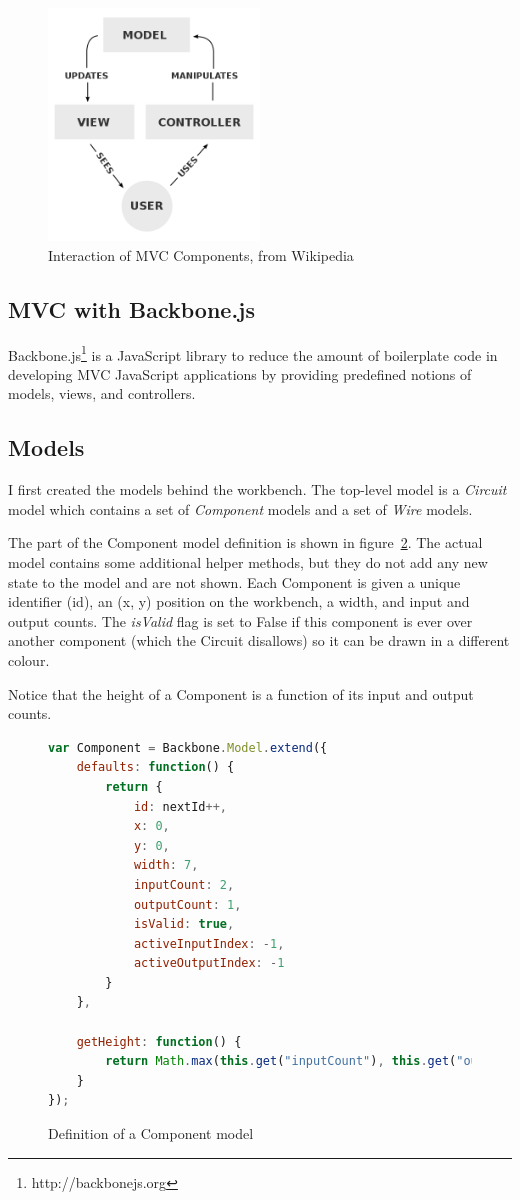\begin{figure}[H]
	\centering
	\includegraphics[width=0.5\textwidth]{mvc.png}
	\caption{Interaction of MVC Components, from Wikipedia}
	\label{fig:mvc}
\end{figure}

\subsection{MVC with Backbone.js}
Backbone.js\footnote{http://backbonejs.org} is a JavaScript library to reduce the amount of boilerplate code in developing MVC JavaScript applications by providing predefined notions of models, views, and controllers.

\subsection{Models}
I first created the models behind the workbench. The top-level model is a \textit{Circuit} model which contains a set of \textit{Component} models and a set of \textit{Wire} models.

The part of the Component model definition is shown in figure~\ref{fig:componentmodel}. The actual model contains some additional helper methods, but they do not add any new state to the model and are not shown. Each Component is given a unique identifier (id), an (x, y) position on the workbench, a width, and input and output counts. The \textit{isValid} flag is set to False if this component is ever over another component (which the Circuit disallows) so it can be drawn in a different colour.

Notice that the height of a Component is a function of its input and output counts.

\begin{figure}
\begin{lstlisting}[language=JavaScript]
var Component = Backbone.Model.extend({
	defaults: function() {
    	return {
        	id: nextId++,
            x: 0,
            y: 0,
            width: 7,
            inputCount: 2,
            outputCount: 1,
            isValid: true,
            activeInputIndex: -1,
            activeOutputIndex: -1
        }
    },

    getHeight: function() {
        return Math.max(this.get("inputCount"), this.get("outputCount")) * 2 + 1;
    }
});
\end{lstlisting}
\caption{Definition of a Component model}
\label{fig:componentmodel}
\end{figure}

